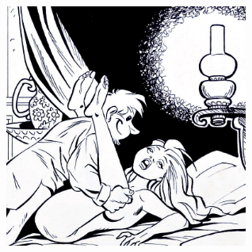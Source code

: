 \bigskip
\begin{center}
\includegraphics[width=0.6\textwidth]{images/en_revenant_de_paris.jpg}
\end{center}
%

\breakpage